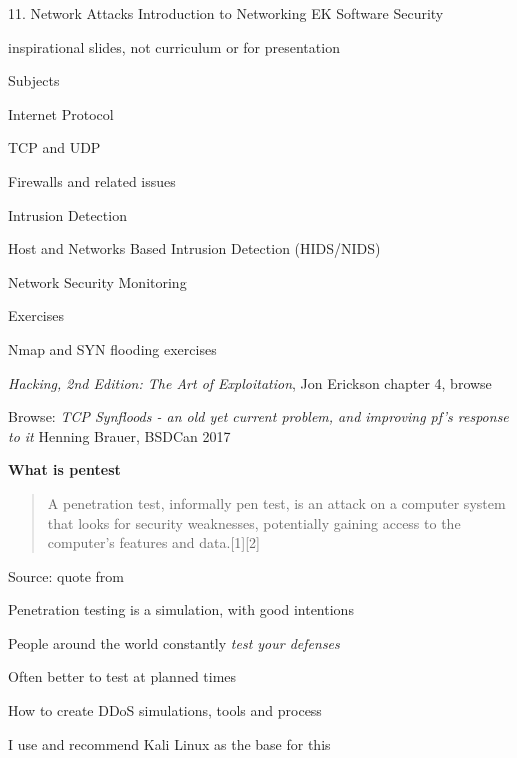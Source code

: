 \documentclass[Screen16to9,17pt]{foils}
\begin{document}
\mytitlepage
{11. Network Attacks Introduction to Networking}
{EK  Software Security}

\centerline{\Large \color{red} inspirational slides, not curriculum or for presentation}



\begin{list1}
\item Subjects
\begin{list2}
\item Internet Protocol
\item TCP and UDP
\item Firewalls and related issues
\item Intrusion Detection
\item Host and Networks Based Intrusion Detection (HIDS/NIDS)
\item Network Security Monitoring
\end{list2}
\item Exercises
\begin{list2}
\item Nmap and SYN flooding exercises
\end{list2}
\end{list1}



\begin{list1}
\item \emph{Hacking, 2nd Edition: The Art of Exploitation}, Jon Erickson chapter 4, browse
\item Browse: \emph{TCP Synfloods - an old yet current problem, and improving pf's response to it}
Henning Brauer, BSDCan 2017 
\end{list1}




{\bf What is pentest}

\begin{quote}
A penetration test, informally pen test, is an attack on a computer system that looks for security weaknesses, potentially gaining access to the computer's features and data.[1][2]
\end{quote}
Source: quote from 

\begin{list1}
\item Penetration testing is a simulation, with good intentions
\item People around the world constantly \emph{test your defenses}
\item Often better to test at planned times
\item How to create DDoS simulations, tools and process
\item I use and recommend Kali Linux as the base for this
\end{list1}
\end{document}
